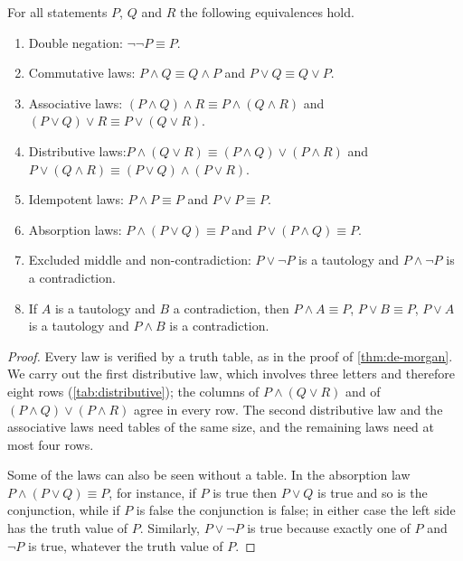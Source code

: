 \begin{proposition}
\label{prop:laws}
For all statements $P$, $Q$ and $R$ the following equivalences hold.
\begin{enumerate}
\item Double negation: $\neg\neg P\equiv P$.
\item Commutative laws: $P\wedge Q\equiv Q\wedge P$ and $P\vee Q\equiv Q\vee P$.
\item Associative laws: $(P\wedge Q)\wedge R\equiv P\wedge(Q\wedge R)$ and $(P\vee Q)\vee R\equiv P\vee(Q\vee R)$.
\item Distributive laws:\newline $P\wedge(Q\vee R)\equiv(P\wedge Q)\vee(P\wedge R)$ and $P\vee(Q\wedge R)\equiv(P\vee Q)\wedge(P\vee R)$.
\item Idempotent laws: $P\wedge P\equiv P$ and $P\vee P\equiv P$.
\item Absorption laws: $P\wedge(P\vee Q)\equiv P$ and $P\vee(P\wedge Q)\equiv P$.
\item Excluded middle and non-contradiction: $P\vee\neg P$ is a tautology and $P\wedge\neg P$ is a contradiction.
\item If $A$ is a tautology and $B$ a contradiction, then $P\wedge A\equiv P$, $P\vee B\equiv P$, $P\vee A$ is a tautology and $P\wedge B$ is a contradiction.
\end{enumerate}
\end{proposition}

\begin{proof}
Every law is verified by a truth table, as in the proof of \cref{thm:de-morgan}. We carry out the first distributive law, which involves three letters and therefore eight rows (\cref{tab:distributive}); the columns of $P\wedge(Q\vee R)$ and of $(P\wedge Q)\vee(P\wedge R)$ agree in every row. The second distributive law and the associative laws need tables of the same size, and the remaining laws need at most four rows.

Some of the laws can also be seen without a table. In the absorption law $P\wedge(P\vee Q)\equiv P$, for instance, if $P$ is true then $P\vee Q$ is true and so is the conjunction, while if $P$ is false the conjunction is false; in either case the left side has the truth value of $P$. Similarly, $P\vee\neg P$ is true because exactly one of $P$ and $\neg P$ is true, whatever the truth value of $P$.
\end{proof}

